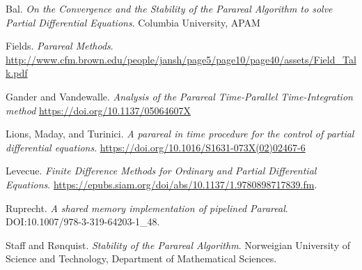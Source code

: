 \begin{thebibliography}{9}
Bal.
\textit{On the Convergence and the Stability of the Parareal Algorithm to solve
Partial Differential Equations}.
Columbia University, APAM

Fields.
\textit{Parareal Methods}.
\url{http://www.cfm.brown.edu/people/jansh/page5/page10/page40/assets/Field_Talk.pdf}

Gander and Vandewalle.
\textit{Analysis of the Parareal Time-Parallel Time-Integration method}
\url{https://doi.org/10.1137/05064607X}

Lions, Maday, and Turinici.
\textit{A parareal in time procedure for the control of partial differential
equations}.
\url{https://doi.org/10.1016/S1631-073X(02)02467-6}

Levecue.
\textit{Finite Difference Methods for Ordinary and Partial Differential
  Equations}.
\url{https://epubs.siam.org/doi/abs/10.1137/1.9780898717839.fm}.

Ruprecht.
\textit{A shared memory implementation of pipelined Parareal}.
DOI:10.1007/978-3-319-64203-1\_48.

Staff and R{\o}nquist.
\textit{Stability of the Parareal Algorithm}.
Norweigian University of Science and Technology, Department of Mathematical
Sciences.


\end{thebibliography}
